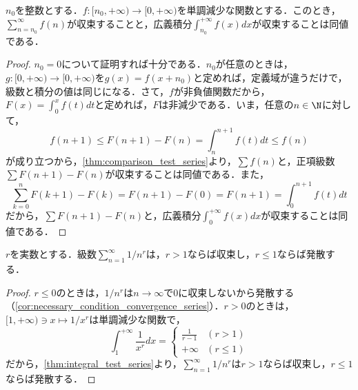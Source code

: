 \documentclass[a4paper,10pt]{ltjsarticle}
\begin{document}
\begin{MyTheorem}
  \(n_0\)を整数とする．\(f: [n_0, +\infty) \to [0, +\infty)\)を単調減少な関数とする．このとき，\(\sum_{n=n_0}^{\infty} f(n)\)が収束することと，広義積分\(\int_{n_0}^{+\infty} f(x)dx\)が収束することは同値である．
\end{MyTheorem}
\begin{proof}
  \(n_0 = 0\)について証明すれば十分である．\(n_0\)が任意のときは，\(g: [0, +\infty) \to [0, +\infty)\)を\(g(x) = f(x + n_0)\)と定めれば，定義域が違うだけで，級数と積分の値は同じになる．さて，\(f\)が非負値関数だから，\(F(x) = \int_0^x f(t)dt\)と定めれば，\(F\)は非減少である．いま，任意の\(n \in \N\)に対して，
  \[ f(n+1) \le F(n+1) - F(n) = \int_{n}^{n+1}f(t)dt \le f(n) \]
  が成り立つから，\cref{thm:comparison_test_series}より，\(\sum f(n)\)と，正項級数\(\sum F(n + 1) - F(n)\)が収束することは同値である．また，
  \[ \sum_{k=0}^n F(k + 1) - F(k) = F(n + 1) - F(0) = F(n + 1) = \int_0^{n + 1} f(t)dt \]
  だから，\(\sum F(n + 1) - F(n)\)と，広義積分\(\int_0^{+\infty} f(x)dx\)が収束することは同値である．
\end{proof}

\begin{MyLemma}
  \(r\)を実数とする．級数\(\sum_{n=1}^\infty 1/n^r\)は，\(r > 1\)ならば収束し，\(r \le 1\)ならば発散する．
\end{MyLemma}
\begin{proof}
  \(r \le 0\)のときは，\(1/n^r\)は\(n\to\infty\)で\(0\)に収束しないから発散する（\cref{cor:necessary_condition_convergence_series}）．\(r > 0\)のときは，\([1, +\infty) \ni x \mapsto 1/x^r\)は単調減少な関数で，
  \[
    \int_1^{+\infty} \frac{1}{x^r}dx = \begin{cases}
      \frac{1}{r - 1} & (r > 1)   \\
      +\infty         & (r \le 1)
    \end{cases}
  \]
  だから，\cref{thm:integral_test_series}より，\(\sum_{n=1}^\infty 1/n^r\)は\(r > 1\)ならば収束し，\(r \le 1\)ならば発散する．
\end{proof}
\end{document}
